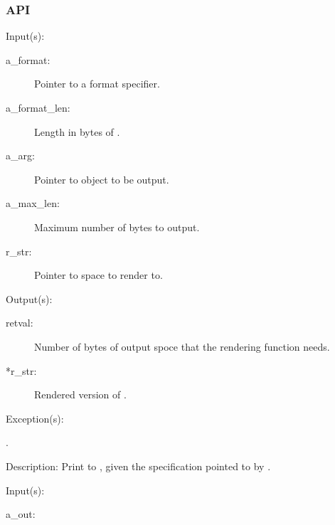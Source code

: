 \subsubsection{API}
\begin{capi}
\label{cw_out_render_t}
	\begin{capilist}
	\item[Input(s): ]
		\begin{description}\item[]
		\item[a\_format: ]
			Pointer to a format specifier.
		\item[a\_format\_len: ]
			Length in bytes of .
		\item[a\_arg: ]
			Pointer to object to be output.
		\item[a\_max\_len: ]
			Maximum number of bytes to output.
		\item[r\_str: ]
			Pointer to space to render to.
		\end{description}
	\item[Output(s): ]
		\begin{description}\item[]
		\item[retval: ]
			Number of bytes of output spoce that the rendering
			function needs.
		\item[*r\_str: ]
			Rendered version of .
		\end{description}
	\item[Exception(s): ]
		\begin{description}\item[]
		\item[.]
		\end{description}
	\item[Description: ]
		Print  to , given the specification
		pointed to by .
	\end{capilist}
\label{out_new}
	\begin{capilist}
	\item[Input(s): ]
		\begin{description}\item[]
		\item[a\_out: ]

\end{description}
\end{capilist}
\end{capi}
